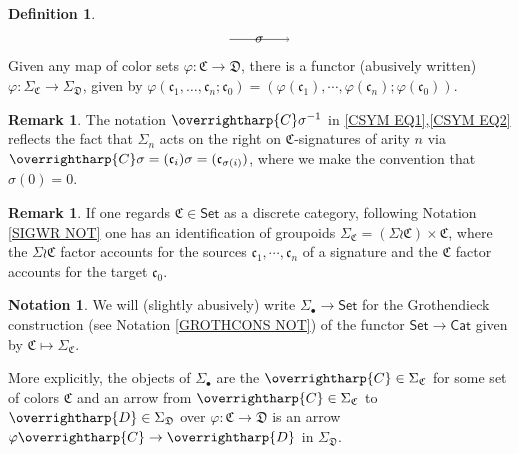\documentclass[a4paper,10pt
,draft
]{article}%
\numberwithin{equation}{section}
\numberwithin{figure}{section}
\theoremstyle{definition} %
\newtheorem{definition}[equation]{Definition}%
\newtheorem{remark}[equation]{Remark}%
\newtheorem{notation}[equation]{Notation}%
\newcommand{\vect}[1]{\text{\overrightharp{\ensuremath{#1}}}}
\newcommand{\1}{\ensuremath{\mathbbm 1}}%
\begin{document}
\begin{definition}
\begin{equation}
\begin{tikzpicture}
	\draw[->] (1.5,0.8) -- node{$\sigma$} (3,0.8);
	\end{tikzpicture}
	\end{equation}
	Given any map of color sets $\varphi \colon \mathfrak{C} \to \mathfrak{D}$,
	there is a functor (abusively written)
	$\varphi \colon \Sigma_{\mathfrak{C}} \to \Sigma_{\mathfrak{D}}$,
	given by 
	$\varphi (\mathfrak c_1, \dots, \mathfrak c_n; \mathfrak c_0) = (\varphi(\mathfrak c_1),\cdots,\varphi(\mathfrak c_n);\varphi(\mathfrak c_0))$. 
\end{definition}


\begin{remark}\label{GLOBSIG REM}
	The notation $\vect{C} \sigma^{-1}$
	in \eqref{CSYM EQ1},\eqref{CSYM EQ2}
	reflects the fact that $\Sigma_n$
	acts on the right on $\mathfrak{C}$-signatures of arity $n$
	via 
	$\vect{C} \sigma = (\mathfrak{c}_i)\sigma = 
	(\mathfrak{c}_{\sigma(i)})$,
	where we make the convention that $\sigma(0)=0$.
\end{remark}



\begin{remark}
	If one regards $\mathfrak{C} \in \mathsf{Set}$
	as a discrete category, 
	following Notation \ref{SIGWR NOT} one has an identification 
	of groupoids
	$\Sigma_{\mathfrak{C}} = (\Sigma \wr \mathfrak{C}) \times \mathfrak{C}$,
	where the 
	$\Sigma \wr \mathfrak{C}$ factor accounts for the sources
	$\mathfrak{c}_1,\cdots,\mathfrak{c}_n$ of a signature
	and the $\mathfrak{C}$ factor accounts for the target 
	$\mathfrak{c}_0$.
\end{remark}



\begin{notation}
	We will (slightly abusively) write
	$\Sigma_{\bullet} \to \mathsf{Set}$
	for the Grothendieck construction (see Notation \ref{GROTHCONS NOT})
	of the functor
	$\mathsf{Set} \to \mathsf{Cat}$ given by
	$\mathfrak{C} \mapsto \Sigma_{\mathfrak{C}}$.
	
	More explicitly, 
	the objects of $\Sigma_{\bullet}$
	are the $\vect{C} \in \Sigma_{\mathfrak{C}}$ 
	for some set of colors $\mathfrak{C}$
	and an arrow from
	$\vect{C} \in \Sigma_{\mathfrak{C}}$ to
	$\vect{D} \in \Sigma_{\mathfrak{D}}$
	over $\varphi \colon \mathfrak{C} \to \mathfrak{D}$
	is an arrow
	$\varphi \vect{C} \to \vect{D}$ in $\Sigma_{\mathfrak{D}}$.
\end{notation}
\end{document}
